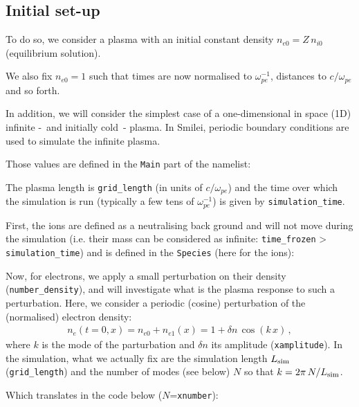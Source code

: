 \documentclass[11pt,a4paper]{article}
\newcommand{\class}[1] {{\color{magenta}\texttt{#1}}}
\newcommand{\code}[1] {{\color{classcolour}\texttt{#1}}}
\newcommand{\param}[1] {{\color{paramcolour}\texttt{#1}}}
\newcommand{\addsubsection}[1] {
\subsection*{#1}
\addcontentsline{toc}{subsection}{#1}}
\begin{document}
\addsubsection{Initial set-up}
To do so, we consider a plasma with an initial  constant density $n_{e0} = Z\,n_{i0}$ (equilibrium solution).

We also fix $n_{e0}=1$ such that times are now normalised to $\omega_{pe}^{-1}$, distances to $c/\omega_{pe}$ and so forth.

In addition, we will consider the simplest case of a one-dimensional in space (1D) infinite -~and initially cold~- plasma.
In Smilei, periodic boundary conditions are used to simulate the infinite plasma.

Those values are defined in the \class{Main} part of the namelist:


The plasma length is \code{grid\_length}  (in units of $c/\omega_{pe}$) and the time over which the simulation is run (typically a few tens of $\omega_{pe}^{-1}$) is given by \code{simulation\_time}. 

First, the ions are defined as a neutralising back ground and will not move during the simulation (i.e. their mass can be considered as infinite: \code{time\_frozen} > \code{simulation\_time}) and is defined in the \class{Species} (here for the ions):


Now, for electrons, we apply a small perturbation on their density (\code{number\_density}), and will investigate what is the plasma response to such a perturbation.
Here, we consider a periodic (cosine) perturbation of the (normalised) electron density:
\begin{eqnarray}\label{eq_pert}
n_e(t=0,x) = n_{e0}+n_{e1}(x) = 1 + \delta n\,\cos(k\,x)\,,
\end{eqnarray}
where $k$ is the mode of the parturbation and $\delta n$ its amplitude (\param{xamplitude}). 
In the simulation, what we actually fix are the simulation length $L_{\rm sim}$ (\code{grid\_length}) and the number of modes (see below) $N$ so that $k=2\pi\,N/L_{\rm sim}$.

Which translates in the code below ($N$=\param{xnumber}):


\newpage 
\end{document}
